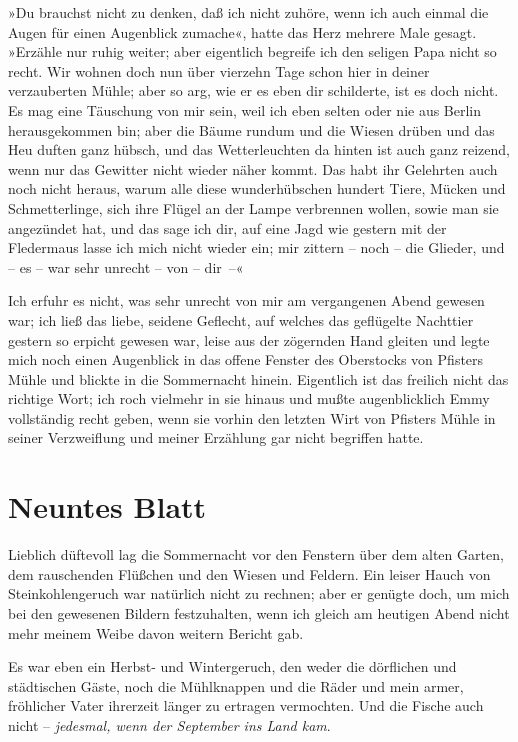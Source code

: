 »Du brauchst nicht zu denken, daß ich nicht zuhöre, wenn ich auch
einmal die Augen für einen Augenblick zumache«, hatte das Herz
mehrere Male gesagt. »Erzähle nur ruhig weiter; aber eigentlich
begreife ich den seligen Papa nicht so recht. Wir wohnen doch nun
über vierzehn Tage schon hier in deiner verzauberten Mühle; aber so
arg, wie er es eben dir schilderte, ist es doch nicht. Es mag eine
Täuschung von mir sein, weil ich eben selten oder nie aus Berlin
herausgekommen bin; aber die Bäume rundum und die Wiesen drüben und
das Heu duften ganz hübsch, und das Wetterleuchten da hinten ist
auch ganz reizend, wenn nur das Gewitter nicht wieder näher kommt.
Das habt ihr Gelehrten auch noch nicht heraus, warum alle diese
wunderhübschen hundert Tiere, Mücken und Schmetterlinge, sich ihre
Flügel an der Lampe verbrennen wollen, sowie man sie angezündet
hat, und das sage ich dir, auf eine Jagd wie gestern mit der
Fledermaus lasse ich mich nicht wieder ein; mir zittern – noch –
die Glieder, und – es – war sehr unrecht – von – dir~–«

Ich erfuhr es nicht, was sehr unrecht von mir am vergangenen Abend
gewesen war; ich ließ das liebe, seidene Geflecht, auf welches das
geflügelte Nachttier gestern so erpicht gewesen war, leise aus der
zögernden Hand gleiten und legte mich noch einen Augenblick in das
offene Fenster des Oberstocks von Pfisters Mühle und blickte in die
Sommernacht hinein. Eigentlich ist das freilich nicht das richtige
Wort; ich roch vielmehr in sie hinaus und mußte augenblicklich Emmy
vollständig recht geben, wenn sie vorhin den letzten Wirt von
Pfisters Mühle in seiner Verzweiflung und meiner Erzählung gar
nicht begriffen hatte.

\section{Neuntes Blatt}

Lieblich düftevoll lag die Sommernacht vor den Fenstern über dem
alten Garten, dem rauschenden Flüßchen und den Wiesen und Feldern.
Ein leiser Hauch von Steinkohlengeruch war natürlich nicht zu
rechnen; aber er genügte doch, um mich bei den gewesenen Bildern
festzuhalten, wenn ich gleich am heutigen Abend nicht mehr meinem
Weibe davon weitern Bericht gab.

Es war eben ein Herbst- und Wintergeruch, den weder die dörflichen
und städtischen Gäste, noch die Mühlknappen und die Räder und mein
armer, fröhlicher Vater ihrerzeit länger zu ertragen vermochten.
Und die Fische auch nicht –
\emph{jedesmal, wenn der September ins Land kam}.

